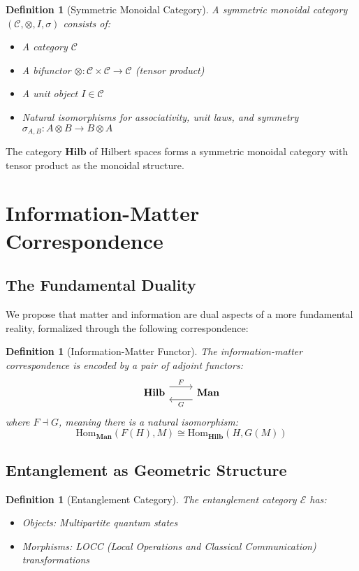 \documentclass[11pt,a4paper]{article}
\newtheorem{definition}[theorem]{Definition}
\newcommand{\Cat}[1]{\mathbf{#1}}
\newcommand{\Hom}{\text{Hom}}
\newcommand{\Hilb}{\Cat{Hilb}}
\newcommand{\Man}{\Cat{Man}}
\begin{document}
\begin{definition}[Symmetric Monoidal Category]
A symmetric monoidal category $(\mathcal{C}, \otimes, I, \sigma)$ consists of:
\begin{itemize}
\item A category $\mathcal{C}$
\item A bifunctor $\otimes: \mathcal{C} \times \mathcal{C} \to \mathcal{C}$ (tensor product)
\item A unit object $I \in \mathcal{C}$
\item Natural isomorphisms for associativity, unit laws, and symmetry $\sigma_{A,B}: A \otimes B \to B \otimes A$
\end{itemize}
\end{definition}

The category $\Hilb$ of Hilbert spaces forms a symmetric monoidal category with tensor product as the monoidal structure.

\section{Information-Matter Correspondence}

\subsection{The Fundamental Duality}

We propose that matter and information are dual aspects of a more fundamental reality, formalized through the following correspondence:

\begin{definition}[Information-Matter Functor]
The information-matter correspondence is encoded by a pair of adjoint functors:
\[
\begin{tikzcd}
\Hilb \arrow[r, shift left=1.5ex, "F"] & \Man \arrow[l, shift left=1.5ex, "G"]
\end{tikzcd}
\]
where $F \dashv G$, meaning there is a natural isomorphism:
\[
\Hom_{\Man}(F(H), M) \cong \Hom_{\Hilb}(H, G(M))
\]
\end{definition}

\subsection{Entanglement as Geometric Structure}

\begin{definition}[Entanglement Category]
The entanglement category $\mathcal{E}$ has:
\begin{itemize}
\item Objects: Multipartite quantum states
\item Morphisms: LOCC (Local Operations and Classical Communication) transformations
\end{itemize}
\end{definition}
\end{document}
